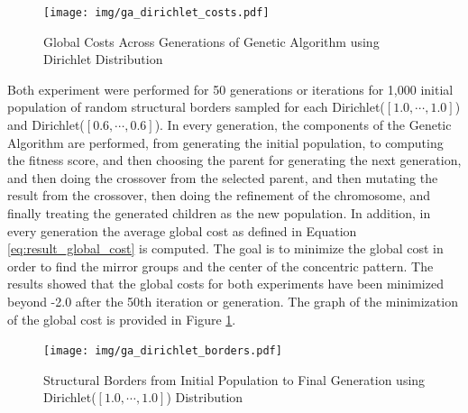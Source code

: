 \begin{figure}[!t]
    \centering
    \texttt{[image: img/ga\_dirichlet\_costs.pdf]}
    \caption{Global Costs Across Generations of Genetic Algorithm using Dirichlet Distribution}
    \label{fig:result_ga_dirichlet_cost}
\end{figure}

Both experiment were performed for 50 generations or iterations for 1,000 initial population of random structural borders sampled for each Dirichlet($[1.0,\cdots,1.0]$) and Dirichlet($[0.6,\cdots,0.6]$). In every generation, the components of the Genetic Algorithm are performed, from generating the initial population, to computing the fitness score, and then choosing the parent for generating the next generation, and then doing the crossover from the selected parent, and then mutating the result from the crossover, then doing the refinement of the chromosome, and finally treating the generated children as the new population. In addition, in every generation the average global cost as defined in Equation \ref{eq:result_global_cost} is computed. The goal is to minimize the global cost in order to find the mirror groups and the center of the concentric pattern. The results showed that the global costs for both experiments have been minimized beyond -2.0 after the 50th iteration or generation. The graph of the minimization of the global cost is provided in Figure \ref{fig:result_ga_dirichlet_cost}.

\begin{figure}[!t]
    \centering
    \texttt{[image: img/ga\_dirichlet\_borders.pdf]}
    \caption{Structural Borders from Initial Population to Final Generation using Dirichlet($[1.0,\cdots,1.0]$) Distribution}
    \label{fig:result_ga_first_final_borders}
\end{figure}

